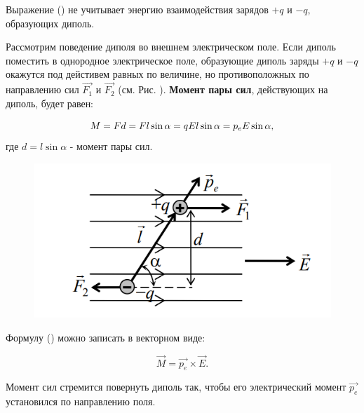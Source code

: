 \documentclass[__minimum__.tex]{subfiles}
\begin{document}
Выражение () не учитывает энергию взаимодействия зарядов $+q$ и $-q$, образующих диполь.

Рассмотрим поведение диполя во внешнем электрическом поле. Если диполь поместить в однородное электрическое поле, образующие диполь заряды $+q$ и $-q$ окажутся под дейстивем равных по величине, но противоположных по направлению сил $\vec{F_1}$ и $\vec{F_2}$ (см. Рис. ).
\textbf{Момент пары сил}, действующих на диполь, будет равен:

\begin{equation}
    M = Fd = Fl\sin \alpha = qEl\sin \alpha = p_e E \sin \alpha,
    \llabel{eq:5}
\end{equation}
где $d = l\sin \alpha$ - момент пары сил.

\begin{figure}[h]
    \centering
    \includegraphics[width=.4\linewidth]{img/e01_2.png}
    \caption{ }
\end{figure}

Формулу () можно записать в векторном виде:

\begin{equation}
    \vec{M} = \vec{p_e} \times \vec{E}.
\end{equation}

Момент сил стремится повернуть диполь так, чтобы его электрический момент $\vec{p_e}$ установился по направлению поля.
\end{document}
